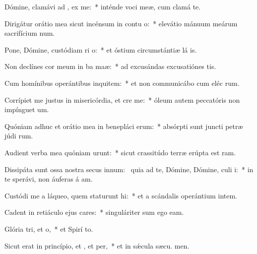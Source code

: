 \item Dómine, clamávi ad , ex me:~* inténde voci meæ, cum clamá  te.
\item Dirigátur orátio mea sicut incénsum in contu o:~* elevátio mánuum meárum sacrifícium num.
\item Pone, Dómine, custódiam ri o:~* et óstium circumstántiæ lá is.
\item Non declínes cor meum in ba maæ:~* ad excusándas excusatiónes  tis.
\item Cum homínibus operántibus inquitem:~* et non communicábo cum eléc rum.
\item Corrípiet me justus in misericórdia, et cre me:~* óleum autem peccatóris non impínguet  um.
\item Quóniam adhuc et orátio mea in benepláci erum:~* absórpti sunt juncti petræ júdi rum.
\item Audient verba mea quóniam urunt:~* sicut crassitúdo terræ erúpta est  ram.
\item Dissipáta sunt ossa nostra secus innum:~\pscross{} quia ad te, Dómine, Dómine, culi i:~* in te sperávi, non áuferas á am.
\item Custódi me a láqueo, quem staturunt hi:~* et a scándalis operántium intem.
\item Cadent in retiáculo ejus cares:~* singuláriter sum ego  eam.
\item Glória tri, et o,~* et Spirí to.
\item Sicut erat in princípio, et , et per,~* et in sǽcula sæcu. men.
